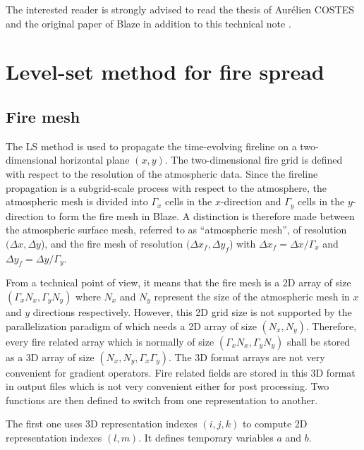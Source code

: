 The interested reader is strongly advised to read the thesis of Aurélien COSTES and the original paper of Blaze in addition to this technical note \citep{costes2021subgrid}.

\section{Level-set method for fire spread}

\subsection{Fire mesh}

The LS method is used to propagate the time-evolving fireline on a two-dimensional horizontal plane $(x, y)$. The two-dimensional fire grid is defined with respect to the resolution of the atmospheric data.
Since the fireline propagation is a subgrid-scale process with respect to the atmosphere, the atmospheric mesh is divided into $\Gamma_x$ cells in the $x$-direction and $\Gamma_y$ cells in the $y$-direction to form the fire mesh in Blaze.
A distinction is therefore made between the atmospheric surface mesh, referred to as ``atmospheric mesh'', of resolution $(\Delta x, \Delta y$), and the fire mesh of resolution $(\Delta x_f, \Delta y_f$) with $\Delta x_f = \Delta x / \Gamma_x$ and $\Delta y_f = \Delta y / \Gamma_y$.

\bigskip

From a technical point of view, it means that the fire mesh is a 2D array of size $(\Gamma_x N_x, \Gamma_y N_y)$ where $N_x$ and $N_y$ represent the size of the atmospheric mesh in $x$ and $y$ directions respectively.
However, this 2D grid size is not supported by the parallelization paradigm of \MNH{} which needs a 2D array of size $(N_x, N_y)$.
Therefore, every fire related array which is normally of size $(\Gamma_x N_x, \Gamma_y N_y)$ shall be stored as a 3D array of size $(N_x, N_y, \Gamma_x \Gamma_y)$.
The 3D format arrays are not very convenient for gradient operators.
Fire related fields are stored in this 3D format in output files which is not very convenient either for post processing. 
Two functions are then defined to switch from one representation to another.

\medskip

The first one uses 3D representation indexes $(i,j,k)$ to compute 2D representation indexes $(l, m)$. It defines temporary variables $a$ and $b$.

